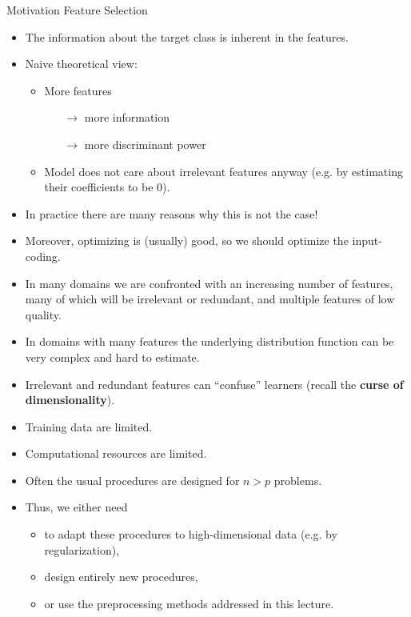 \documentclass[11pt,compress,t,notes=noshow, xcolor=table]{beamer}
\begin{document}
  \begin{vbframe}{Motivation Feature Selection}
    \begin{itemize}
      \item The information about the target class is inherent in the features.
      \item Naive theoretical view:
        \begin{itemize}
          \item More features
          \begin{itemize}
            \item[$\rightarrow$] more information
            \item[$\rightarrow$] more discriminant power
          \end{itemize}
          \item Model does not care about irrelevant features anyway (e.g. by estimating their coefficients to be 0).
        \end{itemize}
      \item In practice there are many reasons why this is not the case!
      \item Moreover, optimizing is (usually) good, so we should optimize the input-coding.
  \end{itemize}

  \framebreak

    \begin{itemize}
      \item In many domains we are confronted with an increasing number of features, many of which will be irrelevant or redundant, and multiple features of low quality.
      \item In domains with many features the underlying distribution function can be very complex and hard to estimate.
      \item Irrelevant and redundant features can \enquote{confuse} learners (recall the \textbf{curse of dimensionality}).
      \item Training data are limited.
      \item Computational resources are limited.
      \item Often the usual procedures are designed for $n > p$ problems.
      \item Thus, we either need
      \begin{itemize}
        \item to adapt these procedures to high-dimensional data (e.g. by regularization),
        \item design entirely new procedures,
        \item or use the preprocessing methods addressed in this lecture.
      \end{itemize}
    \end{itemize}
  \end{vbframe}
\end{document}
